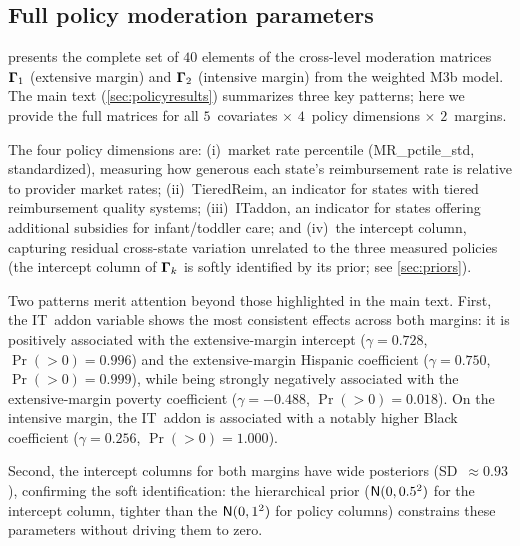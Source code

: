 
\subsection{Full policy moderation parameters}
\label{smd:gamma}

 presents the complete set of $40$ elements of the
cross-level moderation matrices $\boldsymbol{\Gamma}_1$ (extensive margin) and
$\boldsymbol{\Gamma}_2$ (intensive margin) from the weighted M3b model.  The main
text (\cref{sec:policyresults}) summarizes three key patterns; here we
provide the full matrices for all $5$~covariates $\times$
$4$~policy dimensions $\times$ $2$~margins.

The four policy dimensions are: (i)~market rate percentile
(MR\_pctile\_std, standardized), measuring how generous each state's
reimbursement rate is relative to provider market rates;
(ii)~TieredReim, an indicator for states with tiered reimbursement
quality systems; (iii)~ITaddon, an indicator for states offering
additional subsidies for infant/toddler care; and (iv)~the intercept
column, capturing residual cross-state variation unrelated to the
three measured policies (the intercept column of $\boldsymbol{\Gamma}_k$
is softly identified by its prior; see \cref{sec:priors}).

Two patterns merit attention beyond those highlighted in the main text.
First, the IT~addon variable shows the most consistent effects across
both margins: it is positively associated with the extensive-margin
intercept ($\gamma = 0.728$, $\Pr(>0) = 0.996$) and the
extensive-margin Hispanic coefficient ($\gamma = 0.750$,
$\Pr(>0) = 0.999$), while being strongly negatively associated with
the extensive-margin poverty coefficient ($\gamma = -0.488$,
$\Pr(>0) = 0.018$).  On the intensive margin, the IT~addon is
associated with a notably higher Black coefficient ($\gamma = 0.256$,
$\Pr(>0) = 1.000$).

Second, the intercept columns for both margins have wide
posteriors (SD~$\approx 0.93$), confirming the soft
identification: the hierarchical prior
($\textsf{N}(0, 0.5^2)$ for the intercept column, tighter than the
$\textsf{N}(0, 1^2)$ for policy columns) constrains these parameters
without driving them to zero.

